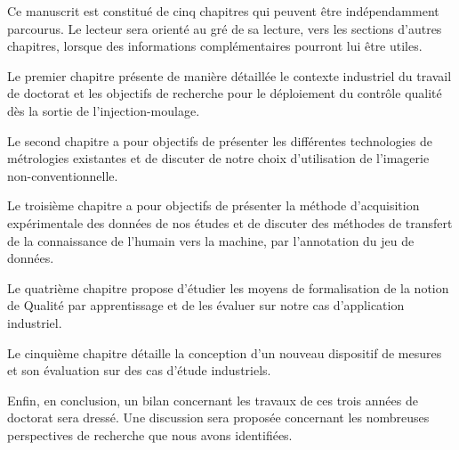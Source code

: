 \bigskip

Ce manuscrit est constitué de cinq chapitres qui peuvent être indépendamment parcourus.
Le lecteur sera orienté au gré de sa lecture, vers les sections d'autres chapitres, lorsque des informations complémentaires pourront lui être utiles.

Le premier chapitre présente de manière détaillée le contexte industriel du travail de doctorat et les objectifs de recherche pour le déploiement du contrôle qualité dès la sortie de l'injection-moulage.  %

Le second chapitre a pour objectifs de présenter les différentes technologies de métrologies existantes et de discuter de notre choix d'utilisation de l'imagerie non-conventionnelle.  %

Le troisième chapitre a pour objectifs de présenter la méthode d'acquisition expérimentale des données de nos études et de discuter des méthodes de transfert de la connaissance de l'humain vers la machine, par l'annotation du jeu de données.  %

Le quatrième chapitre propose d'étudier les moyens de formalisation de la notion de Qualité par apprentissage et de les évaluer sur notre cas d'application industriel.  %

Le cinquième chapitre détaille la conception d'un nouveau dispositif de mesures et son évaluation sur des cas d'étude industriels.  %

Enfin, en conclusion, un bilan concernant les travaux de ces trois années de doctorat sera dressé.
Une discussion sera proposée concernant les nombreuses perspectives de recherche que nous avons identifiées.  %